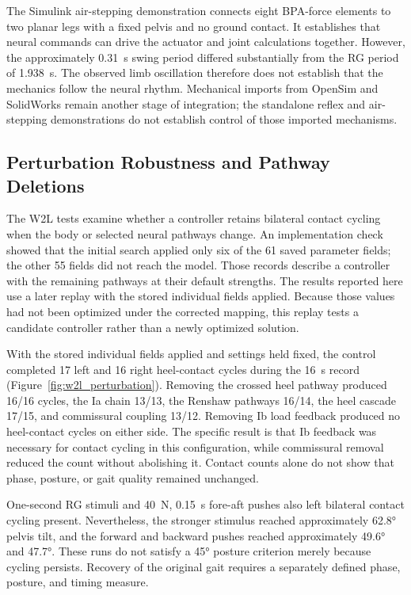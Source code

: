 The Simulink air-stepping demonstration connects eight BPA-force elements to two planar legs with a fixed pelvis and no ground contact. It establishes that neural commands can drive the actuator and joint calculations together. However, the approximately \qty{0.31}{\second} swing period differed substantially from the RG period of \qty{1.938}{\second}. The observed limb oscillation therefore does not establish that the mechanics follow the neural rhythm. Mechanical imports from OpenSim and SolidWorks remain another stage of integration; the standalone reflex and air-stepping demonstrations do not establish control of those imported mechanisms.

\subsection{Perturbation Robustness and Pathway Deletions}\label{sec:w2l_perturbation}

The W2L tests examine whether a controller retains bilateral contact cycling when the body or selected neural pathways change. An implementation check showed that the initial search applied only six of the 61 saved parameter fields; the other 55 fields did not reach the model. Those records describe a controller with the remaining pathways at their default strengths. The results reported here use a later replay with the stored individual fields applied. Because those values had not been optimized under the corrected mapping, this replay tests a candidate controller rather than a newly optimized solution.

With the stored individual fields applied and settings held fixed, the control completed 17 left and 16 right heel-contact cycles during the \qty{16}{\second} record (Figure~\ref{fig:w2l_perturbation}). Removing the crossed heel pathway produced 16/16 cycles, the Ia chain 13/13, the Renshaw pathways 16/14, the heel cascade 17/15, and commissural coupling 13/12. Removing Ib load feedback produced no heel-contact cycles on either side. The specific result is that Ib feedback was necessary for contact cycling in this configuration, while commissural removal reduced the count without abolishing it. Contact counts alone do not show that phase, posture, or gait quality remained unchanged.

One-second RG stimuli and \qty{40}{\newton}, \qty{0.15}{\second} fore-aft pushes also left bilateral contact cycling present. Nevertheless, the stronger stimulus reached approximately \ang{62.8} pelvis tilt, and the forward and backward pushes reached approximately \ang{49.6} and \ang{47.7}. These runs do not satisfy a \ang{45} posture criterion merely because cycling persists. Recovery of the original gait requires a separately defined phase, posture, and timing measure.

